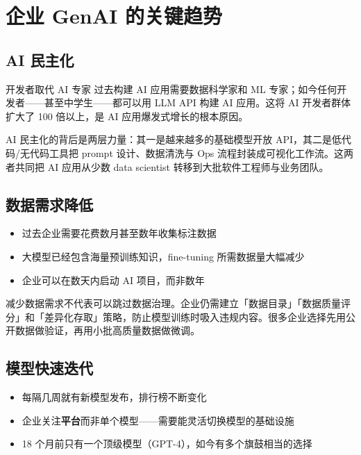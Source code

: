 \section{企业 GenAI 的关键趋势}

\subsection{AI 民主化}

\begin{importantbox}{开发者取代 AI 专家}
过去构建 AI 应用需要数据科学家和 ML 专家；如今任何开发者——甚至中学生——都可以用 LLM API 构建 AI 应用。这将 AI 开发者群体扩大了 100 倍以上，是 AI 应用爆发式增长的根本原因。
\end{importantbox}

AI 民主化的背后是两层力量：其一是越来越多的基础模型开放 API，其二是低代码/无代码工具把 prompt 设计、数据清洗与 Ops 流程封装成可视化工作流。这两者共同把 AI 应用从少数 data scientist 转移到大批软件工程师与业务团队。

\subsection{数据需求降低}

\begin{itemize}
    \item 过去企业需要花费数月甚至数年收集标注数据
    \item 大模型已经包含海量预训练知识，fine-tuning 所需数据量大幅减少
    \item 企业可以在数天内启动 AI 项目，而非数年
\end{itemize}

减少数据需求不代表可以跳过数据治理。企业仍需建立「数据目录」「数据质量评分」和「差异化存取」策略，防止模型训练时吸入违规内容。很多企业选择先用公开数据做验证，再用小批高质量数据做微调。

\subsection{模型快速迭代}

\begin{itemize}
    \item 每隔几周就有新模型发布，排行榜不断变化
    \item 企业关注\textbf{平台}而非单个模型——需要能灵活切换模型的基础设施
    \item 18 个月前只有一个顶级模型（GPT-4），如今有多个旗鼓相当的选择
\end{itemize}

